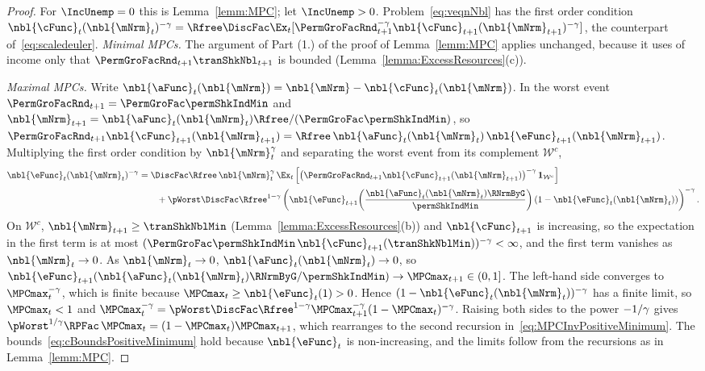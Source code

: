 \documentclass[\econtexRoot/BufferStockTheory]{subfiles}
\begin{document}
\begin{proof}
For $\IncUnemp=0$ this is Lemma~\ref{lemm:MPC}; let $\IncUnemp>0$.
Problem~\eqref{eq:veqnNbl} has the first order condition $\nbl{\cFunc}_{t}(\nbl{\mNrm}_{t})^{-\CRRA}=\Rfree\DiscFac\Ex_{t}[\PermGroFacRnd_{t+1}^{-\CRRA}\nbl{\cFunc}_{t+1}(\nbl{\mNrm}_{t+1})^{-\CRRA}]$, the counterpart of~\eqref{eq:scaledeuler}.
\emph{Minimal MPCs.}
The argument of Part (1.) of the proof of Lemma~\ref{lemm:MPC} applies unchanged, because it uses of income only that $\PermGroFacRnd_{t+1}\tranShkNbl_{t+1}$ is bounded (Lemma~\ref{lemma:ExcessResources}(c)).

\emph{Maximal MPCs.}
Write $\nbl{\aFunc}_{t}(\nbl{\mNrm})=\nbl{\mNrm}-\nbl{\cFunc}_{t}(\nbl{\mNrm})$.
In the worst event $\PermGroFacRnd_{t+1}=\PermGroFac\permShkIndMin$ and $\nbl{\mNrm}_{t+1}=\nbl{\aFunc}_{t}(\nbl{\mNrm}_{t})\Rfree/(\PermGroFac\permShkIndMin)$, so $\PermGroFacRnd_{t+1}\nbl{\cFunc}_{t+1}(\nbl{\mNrm}_{t+1})=\Rfree\,\nbl{\aFunc}_{t}(\nbl{\mNrm}_{t})\,\nbl{\eFunc}_{t+1}(\nbl{\mNrm}_{t+1})$.
Multiplying the first order condition by $\nbl{\mNrm}_{t}^{\CRRA}$ and separating the worst event from its complement $\mathcal{W}^{c}$,
\begin{equation}\label{eq:eFuncEulerPositiveMinimum}
  \begin{aligned}
  \nbl{\eFunc}_{t}(\nbl{\mNrm}_{t})^{-\CRRA}
  & =\DiscFac\Rfree\,\nbl{\mNrm}_{t}^{\CRRA}\,\Ex_{t}\left[\left(\PermGroFacRnd_{t+1}\nbl{\cFunc}_{t+1}(\nbl{\mNrm}_{t+1})\right)^{-\CRRA}\mathbf{1}_{\mathcal{W}^{c}}\right] \\
  & \qquad +\pWorst\DiscFac\Rfree^{1-\CRRA}\left(\nbl{\eFunc}_{t+1}\!\left(\frac{\nbl{\aFunc}_{t}(\nbl{\mNrm}_{t})\RNrmByG}{\permShkIndMin}\right)\left(1-\nbl{\eFunc}_{t}(\nbl{\mNrm}_{t})\right)\right)^{-\CRRA}.
  \end{aligned}
\end{equation}
On $\mathcal{W}^{c}$, $\nbl{\mNrm}_{t+1}\geq\tranShkNblMin$ (Lemma~\ref{lemma:ExcessResources}(b)) and $\nbl{\cFunc}_{t+1}$ is increasing, so the expectation in the first term is at most $(\PermGroFac\permShkIndMin\,\nbl{\cFunc}_{t+1}(\tranShkNblMin))^{-\CRRA}<\infty$, and the first term vanishes as $\nbl{\mNrm}_{t}\rightarrow 0$.
As $\nbl{\mNrm}_{t}\rightarrow 0$, $\nbl{\aFunc}_{t}(\nbl{\mNrm}_{t})\rightarrow 0$, so $\nbl{\eFunc}_{t+1}(\nbl{\aFunc}_{t}(\nbl{\mNrm}_{t})\RNrmByG/\permShkIndMin)\rightarrow\MPCmax_{t+1}\in(0,1]$.
The left-hand side converges to $\MPCmax_{t}^{-\CRRA}$, which is finite because $\MPCmax_{t}\geq\nbl{\eFunc}_{t}(1)>0$.
Hence $(1-\nbl{\eFunc}_{t}(\nbl{\mNrm}_{t}))^{-\CRRA}$ has a finite limit, so $\MPCmax_{t}<1$ and
$\MPCmax_{t}^{-\CRRA}=\pWorst\DiscFac\Rfree^{1-\CRRA}\MPCmax_{t+1}^{-\CRRA}(1-\MPCmax_{t})^{-\CRRA}$.
Raising both sides to the power $-1/\gamma$ gives $\pWorst^{1/\CRRA}\RPFac\,\MPCmax_{t}=(1-\MPCmax_{t})\MPCmax_{t+1}$, which rearranges to the second recursion in~\eqref{eq:MPCInvPositiveMinimum}.
The bounds~\eqref{eq:cBoundsPositiveMinimum} hold because $\nbl{\eFunc}_{t}$ is non-increasing, and the limits follow from the recursions as in Lemma~\ref{lemm:MPC}.
\end{proof}
\end{document}
